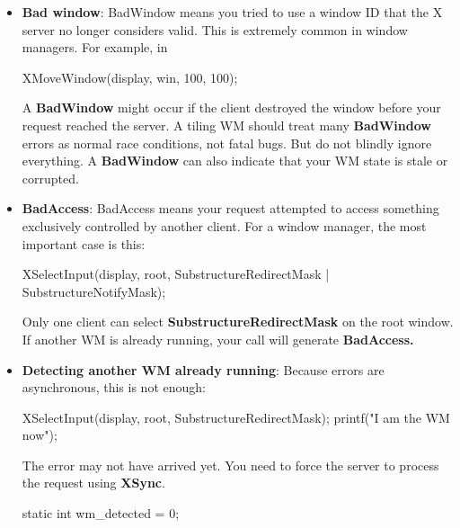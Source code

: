 \documentclass{report}
\begin{document}
\begin{itemize}
\begin{cppcode}
{                    return 0;
                }
            \end{cppcode}
            \bigbreak \noindent 
            Then, install it 
            \bigbreak \noindent 
            \begin{cppcode}
            XSetErrorHandler(x_error_handler);
            \end{cppcode}
            \bigbreak \noindent 
            The handler is called when the X server reports an error for one of your requests.
            \bigbreak \noindent 
            Important: the error handler is \textbf{global per process}, not per request. You cannot easily attach a normal callback to one X request.
        \item \textbf{Bad window}: BadWindow means you tried to use a window ID that the X server no longer considers valid.
            \bigbreak \noindent 
            This is extremely common in window managers.
            \bigbreak \noindent 
            For example, in 
            \bigbreak \noindent 
            \begin{cppcode}
            XMoveWindow(display, win, 100, 100);
            \end{cppcode}
            \bigbreak \noindent 
            A \textbf{BadWindow} might occur if the client destroyed the window before your request reached the server. A tiling WM should treat many \textbf{BadWindow} errors as normal race conditions, not fatal bugs.
            \bigbreak \noindent 
            But do not blindly ignore everything. A \textbf{BadWindow} can also indicate that your WM state is stale or corrupted.
        \item \textbf{BadAccess}: BadAccess means your request attempted to access something exclusively controlled by another client.
            \bigbreak \noindent 
            For a window manager, the most important case is this: 
            \bigbreak \noindent 
            \begin{cppcode}
                XSelectInput(display, root, SubstructureRedirectMask | SubstructureNotifyMask);
            \end{cppcode}
            \bigbreak \noindent 
            Only one client can select \textbf{SubstructureRedirectMask} on the root window. If another WM is already running, your call will generate \textbf{BadAccess.}
        \item \textbf{Detecting another WM already running}: Because errors are asynchronous, this is not enough:
            \bigbreak \noindent 
            \begin{cppcode}
                XSelectInput(display, root, SubstructureRedirectMask);
                printf("I am the WM now\n");
            \end{cppcode}
            \bigbreak \noindent 
            The error may not have arrived yet. You need to force the server to process the request using \textbf{XSync}.
            \bigbreak \noindent 
            \begin{cppcode}
                static int wm_detected = 0;


\end{cppcode}
\end{itemize}
\end{document}
